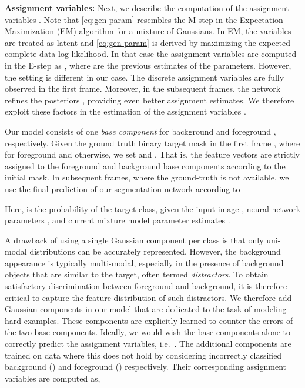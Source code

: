 \documentclass[10pt,twocolumn,letterpaper]{article}
\newcommand{\parsection}[1]{\noindent\textbf{#1:} }
\begin{document}
\parsection{Assignment variables}
Next, we describe the computation of the assignment variables . Note that \eqref{eq:gen-param} resembles the M-step in the Expectation Maximization (EM) algorithm for a mixture of Gaussians. In EM, the variables  are treated as latent and \eqref{eq:gen-param} is derived by maximizing the expected complete-data log-likelihood. In that case the assignment variables are computed in the E-step as  , where  are the previous estimates of the parameters. However, the setting is different in our case. The discrete assignment variables  are fully observed in the first frame. Moreover, in the subsequent frames, the network refines the posteriors , providing even better assignment estimates. We therefore exploit these factors in the estimation of the assignment variables .

Our model consists of one \emph{base component} for background  and foreground , respectively. Given the ground truth binary target mask in the first frame , where  for foreground and  otherwise, we set  and . That is, the feature vectors  are strictly assigned to the foreground and background base components according to the initial mask. 
In subsequent frames, where the ground-truth is not available, we use the final prediction of our segmentation network according to

Here,  is the probability of the target class, given the input image , neural network parameters , and current mixture model parameter estimates .

A drawback of using a single Gaussian component per class is that only uni-modal distributions can be accurately represented. However, the background appearance is typically multi-modal, especially in the presence of background objects that are similar to the target, often termed \emph{distractors}. To obtain satisfactory discrimination between foreground and background, it is therefore critical to capture the feature distribution of such distractors. We therefore add Gaussian components in our model that are dedicated to the task of modeling hard examples. These components are explicitly learned to counter the errors of the two base components. Ideally, we would wish the base components alone to correctly predict the assignment variables, i.e.\ . The additional components are trained on data where this does not hold by considering incorrectly classified background () and foreground () respectively. Their corresponding assignment variables are computed as,
\end{document}
